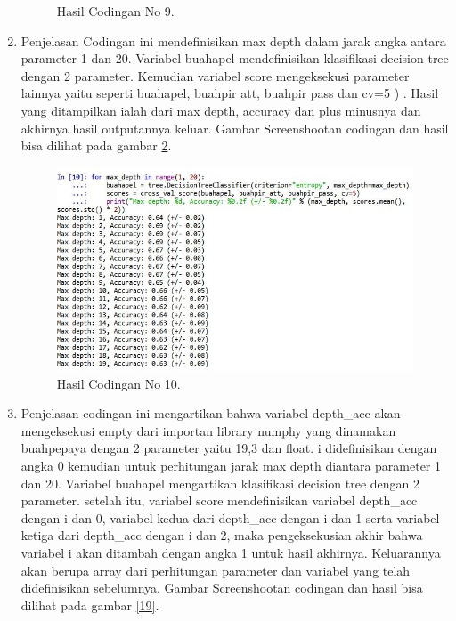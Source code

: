 \begin{enumerate}
\begin{figure}[ht]
		\caption{Hasil Codingan No 9.}
		\label{17}
\end{figure}
\item Penjelasan Codingan ini mendefinisikan max depth dalam jarak angka antara parameter 1 dan 20. Variabel buahapel mendefinisikan klasifikasi decision tree dengan 2 parameter. Kemudian variabel score mengeksekusi parameter lainnya yaitu seperti buahapel, buahpir att, buahpir pass dan cv=5 ) . Hasil yang ditampilkan ialah dari max depth, accuracy dan plus minusnya dan akhirnya hasil outputannya keluar.
\subitem Gambar Screenshootan codingan dan hasil bisa dilihat pada gambar \ref{18}.
\begin{figure}[ht]
		\centerline{\includegraphics[width=1\textwidth]{figures/huda/10_hari4.JPG}}
		\caption{Hasil Codingan No 10.}
		\label{18}
\end{figure}
\item Penjelasan codingan ini mengartikan bahwa variabel depth\_acc akan mengeksekusi empty dari importan library numphy yang dinamakan buahpepaya dengan 2 parameter yaitu 19,3 dan float. i didefinisikan dengan angka 0 kemudian untuk perhitungan jarak max depth diantara parameter 1 dan 20. Variabel buahapel mengartikan klasifikasi decision tree dengan 2 parameter. setelah itu, variabel score mendefinisikan variabel depth\_acc dengan i dan 0, variabel kedua dari depth\_acc dengan i dan 1 serta variabel ketiga dari depth\_acc dengan i dan 2, maka pengeksekusian akhir bahwa variabel i akan ditambah dengan angka 1 untuk hasil akhirnya. Keluarannya akan berupa array dari perhitungan parameter dan variabel yang telah didefinisikan sebelumnya.
\subitem Gambar Screenshootan codingan dan hasil bisa dilihat pada gambar \ref{19}.
\begin{figure}[ht]

\end{figure}
\end{enumerate}
